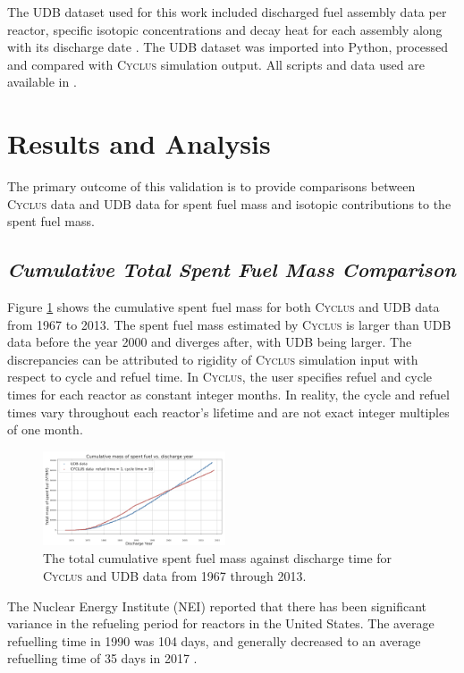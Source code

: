\documentclass{anstrans}
\newcommand{\Cyclus}{\textsc{Cyclus}\xspace}%
\begin{document}
The UDB dataset used for this work included discharged fuel assembly data per 
reactor, specific isotopic concentrations and decay heat for each assembly 
along with its discharge date \cite{peterson_unf-st&dards_2017}. The UDB 
dataset was imported into Python, processed and compared with \Cyclus 
simulation output. All scripts and data used are available in 
\cite{chee_arfc/transition-scenarios_2018}. 
\section{Results and Analysis}
The primary outcome of this validation is to provide comparisons between 
\Cyclus data and UDB data for spent fuel mass and isotopic contributions to the 
spent fuel mass. 

\subsection{\textit{Cumulative Total Spent Fuel Mass Comparison}}
Figure \ref{fig:total_original} shows the cumulative spent fuel mass for both 
\Cyclus and UDB data from 1967 to 2013. The spent fuel mass estimated by 
\Cyclus is larger than UDB data before the year 2000 and diverges after, with 
UDB being larger. The discrepancies can be attributed to rigidity of \Cyclus 
simulation input with respect to cycle and refuel time. In \Cyclus, the user 
specifies refuel and cycle times for each reactor as constant integer months. 
In reality, the cycle and refuel times vary throughout each reactor's lifetime 
and are not exact integer multiples of one month. 

\begin{figure}[t] %
	\centering
	\includegraphics[width=0.48\textwidth]{figures/total_cumulative_mass_spent_fuel_original}
	\caption{The total cumulative spent fuel mass against discharge time for \Cyclus and UDB data from 1967 through 2013.}
	\label{fig:total_original}
\end{figure}

The Nuclear Energy Institute (NEI) reported that there has been significant 
variance in the refueling period for reactors in the United States. The average 
refuelling time in 1990 was 104 days, and generally decreased to an average 
refuelling time of 35 days in 2017 \cite{iaea_current_nodate}.
\end{document}

